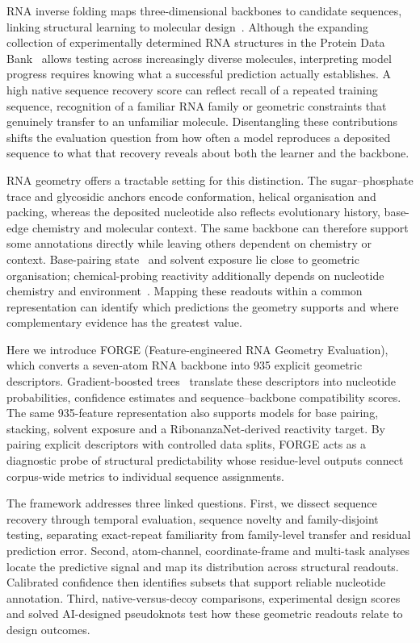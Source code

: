 RNA inverse folding maps three-dimensional backbones to candidate
sequences, linking structural learning to molecular
design~\citep{townshend2021geometric,tan2024rdesign,huang2024ribodiffusion,joshi2025grnade}.
Although the expanding collection of experimentally determined RNA structures in the Protein Data Bank~\citep{berman2000protein,kappel2020accelerated} allows testing across increasingly diverse molecules, interpreting model progress requires knowing what a successful prediction actually establishes. A high native sequence recovery score can reflect recall of a repeated training sequence, recognition of a familiar RNA family or geometric constraints that genuinely transfer to an unfamiliar molecule. Disentangling these contributions shifts the evaluation question from how often a model reproduces a deposited sequence to what that recovery reveals about both the learner and the backbone.

RNA geometry offers a tractable setting for this distinction. The
sugar--phosphate trace and glycosidic anchors encode conformation, helical
organisation and packing, whereas the deposited nucleotide also reflects
evolutionary history, base-edge chemistry and molecular context. The same backbone can therefore support some annotations directly while leaving
others dependent on chemistry or context.
Base-pairing state~\citep{lu2015dssr} and solvent exposure lie close to
geometric organisation; chemical-probing reactivity additionally depends on
nucleotide chemistry and environment~\citep{zubradt2017dms}. Mapping these
readouts within a common representation can identify which predictions the
geometry supports and where complementary evidence has the greatest value.

Here we introduce FORGE (Feature-engineered RNA Geometry Evaluation), which
converts a seven-atom RNA backbone into 935 explicit geometric descriptors.
Gradient-boosted trees~\citep{chen2016xgboost} translate these descriptors into
nucleotide probabilities, confidence estimates and sequence--backbone
compatibility scores. The same 935-feature representation also supports models for base pairing, stacking, solvent exposure and a RibonanzaNet-derived reactivity target. By pairing explicit descriptors with controlled data splits, FORGE acts as a diagnostic probe of structural predictability whose residue-level outputs connect corpus-wide metrics to individual sequence assignments.

The framework addresses three linked questions. First, we dissect sequence
recovery through temporal evaluation, sequence novelty and family-disjoint
testing, separating exact-repeat familiarity from family-level transfer and
residual prediction error. Second, atom-channel, coordinate-frame and
multi-task analyses locate the predictive signal and map its distribution
across structural readouts. Calibrated confidence then identifies subsets
that support reliable nucleotide annotation. Third, native-versus-decoy
comparisons, experimental design scores and solved AI-designed pseudoknots
test how these geometric readouts relate to design outcomes.

